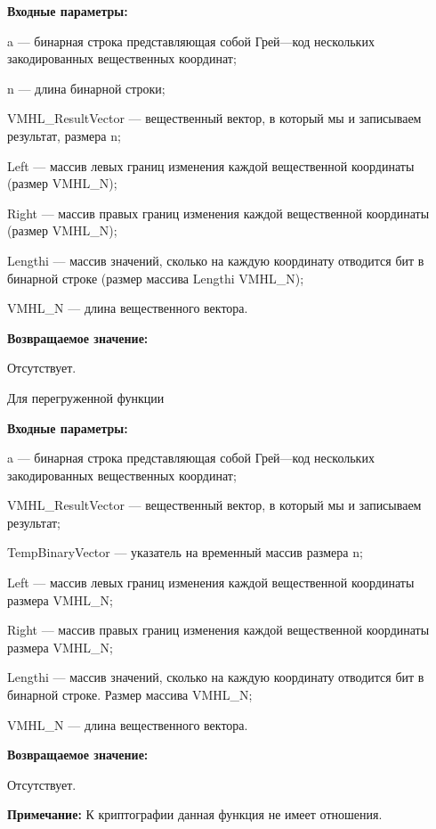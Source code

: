 \documentclass[a4paper,12pt]{article}
\begin{document}
\textbf{Входные параметры:}
 
a --- бинарная строка представляющая собой Грей---код нескольких закодированных вещественных координат;
 
n --- длина бинарной строки;
 
VMHL\_ResultVector --- вещественный вектор, в который мы и записываем результат, размера n;
 
Left --- массив левых границ изменения каждой вещественной координаты (размер VMHL\_N);
 
Right --- массив правых границ изменения каждой вещественной координаты (размер VMHL\_N);
 
Lengthi --- массив значений, сколько на каждую координату отводится бит в бинарной строке (размер массива Lengthi VMHL\_N);
 
VMHL\_N --- длина вещественного вектора.
 

\textbf{Возвращаемое значение:}
 
Отсутствует.
  
Для перегруженной функции
  
\textbf{Входные параметры:}
 
a --- бинарная строка представляющая собой Грей---код нескольких закодированных вещественных координат;
 
VMHL\_ResultVector --- вещественный вектор, в который мы и записываем результат;
 
TempBinaryVector --- указатель на временный массив  размера n;
 
Left --- массив левых границ изменения каждой вещественной координаты размера VMHL\_N;
 
Right --- массив правых границ изменения каждой вещественной координаты размера VMHL\_N;
 
Lengthi --- массив значений, сколько на каждую координату отводится бит в бинарной строке. Размер массива VMHL\_N;
 
VMHL\_N --- длина вещественного вектора.
 
\textbf{Возвращаемое значение:}
 
Отсутствует.

\textbf{Примечание:}
 К криптографии данная функция не имеет отношения.
\end{document}
